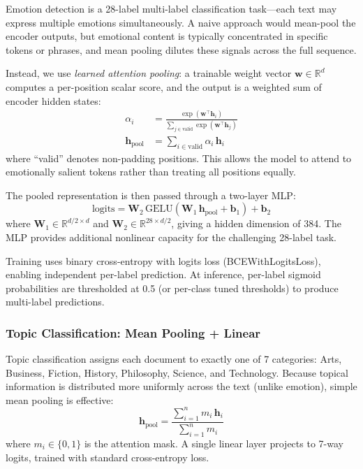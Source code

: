 \documentclass[11pt,a4paper]{article}
\renewcommand{\R}{\mathbb{R}}
\newcommand{\gelu}{\text{GELU}}
\begin{document}
Emotion detection is a 28-label multi-label classification task---each text may express multiple emotions simultaneously.
A naive approach would mean-pool the encoder outputs, but emotional content is typically concentrated in specific tokens or phrases, and mean pooling dilutes these signals across the full sequence.

Instead, we use \emph{learned attention pooling}: a trainable weight vector $\bm{w} \in \R^d$ computes a per-position scalar score, and the output is a weighted sum of encoder hidden states:
\begin{align}
    \alpha_i &= \frac{\exp(\bm{w}^\top \bm{h}_i)}{\sum_{j \in \text{valid}} \exp(\bm{w}^\top \bm{h}_j)} \\
    \bm{h}_\text{pool} &= \sum_{i \in \text{valid}} \alpha_i \, \bm{h}_i
\end{align}
where ``valid'' denotes non-padding positions.
This allows the model to attend to emotionally salient tokens rather than treating all positions equally.

The pooled representation is then passed through a two-layer MLP:
\begin{equation}
    \text{logits} = \bm{W}_2\,\gelu(\bm{W}_1\,\bm{h}_\text{pool} + \bm{b}_1) + \bm{b}_2
\end{equation}
where $\bm{W}_1 \in \R^{d/2 \times d}$ and $\bm{W}_2 \in \R^{28 \times d/2}$, giving a hidden dimension of 384.
The MLP provides additional nonlinear capacity for the challenging 28-label task.

Training uses binary cross-entropy with logits loss (BCEWithLogitsLoss), enabling independent per-label prediction.
At inference, per-label sigmoid probabilities are thresholded at 0.5 (or per-class tuned thresholds) to produce multi-label predictions.

\subsubsection{Topic Classification: Mean Pooling + Linear}

Topic classification assigns each document to exactly one of 7 categories: Arts, Business, Fiction, History, Philosophy, Science, and Technology.
Because topical information is distributed more uniformly across the text (unlike emotion), simple mean pooling is effective:
\begin{equation}
    \bm{h}_\text{pool} = \frac{\sum_{i=1}^{n} m_i \, \bm{h}_i}{\sum_{i=1}^{n} m_i}
\end{equation}
where $m_i \in \{0, 1\}$ is the attention mask.
A single linear layer projects to 7-way logits, trained with standard cross-entropy loss.
\end{document}
